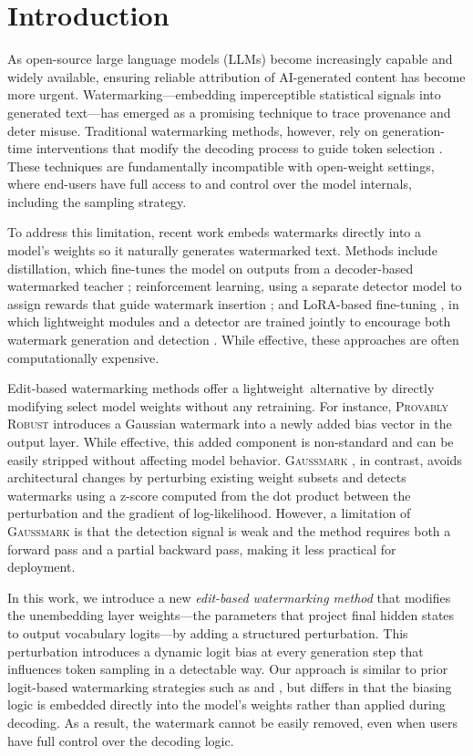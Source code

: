\section{Introduction}

As open-source large language models (LLMs) become increasingly capable and widely available, ensuring reliable attribution of AI-generated content has become more urgent. Watermarking—embedding imperceptible statistical signals into generated text—has emerged as a promising technique to trace provenance and deter misuse. Traditional watermarking methods, however, rely on generation-time interventions that modify the decoding process to guide token selection \cite{kirchenbauer2023watermark}. These techniques are fundamentally incompatible with open-weight settings, where end-users have full access to and control over the model internals, including the sampling strategy.

To address this limitation, recent work embeds watermarks directly into a model's weights so it naturally generates watermarked text. Methods include distillation, which fine-tunes the model on outputs from a decoder-based watermarked teacher \cite{gu2023learnability}; reinforcement learning, using a separate detector model to assign rewards that guide watermark insertion \cite{xu2024learningwatermarkllmgeneratedtext}; and LoRA-based fine-tuning \cite{hu2022lora}, in which lightweight modules and a detector are trained jointly to encourage both watermark generation and detection \cite{elhassan2025can}. While effective, these approaches are often computationally expensive.

Edit-based watermarking methods offer a lightweight alternative by directly modifying select model weights without any retraining. For instance, \textsc{Provably Robust} \cite{christ2024provably} introduces a Gaussian watermark into a newly added bias vector in the output layer. While effective, this added component is non-standard and can be easily stripped without affecting model behavior. \textsc{Gaussmark} \cite{block2025gaussmark}, in contrast, avoids architectural changes by perturbing existing weight subsets and detects watermarks using a z-score computed from the dot product between the perturbation and the gradient of log-likelihood. However, a limitation of \textsc{Gaussmark} is that the detection signal is weak and the method requires both a forward pass and a partial backward pass, making it less practical for deployment.

In this work, we introduce a new \emph{edit-based watermarking method} that modifies the unembedding layer weights—the parameters that project final hidden states to output vocabulary logits—by adding a structured perturbation. This perturbation introduces a dynamic logit bias at every generation step that influences token sampling in a detectable way. Our approach is similar to prior logit-based watermarking strategies such as \citet{kirchenbauer2023watermark} and \citet{liu2024adaptive}, but differs in that the biasing logic is embedded directly into the model's weights rather than applied during decoding. As a result, the watermark cannot be easily removed, even when users have full control over the decoding logic.

